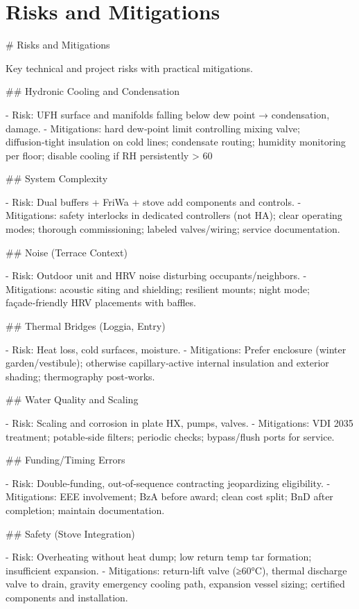 \documentclass[11pt,oneside]{report}
\begin{document}
\chapter{Risks and Mitigations}
\begin{markdown}
# Risks and Mitigations

Key technical and project risks with practical mitigations.

## Hydronic Cooling and Condensation

- Risk: UFH surface and manifolds falling below dew point → condensation, damage.
- Mitigations: hard dew‑point limit controlling mixing valve; diffusion‑tight insulation on cold lines; condensate routing; humidity monitoring per floor; disable cooling if RH persistently > 60%

## System Complexity

- Risk: Dual buffers + FriWa + stove add components and controls.
- Mitigations: safety interlocks in dedicated controllers (not HA); clear operating modes; thorough commissioning; labeled valves/wiring; service documentation.

## Noise (Terrace Context)

- Risk: Outdoor unit and HRV noise disturbing occupants/neighbors.
- Mitigations: acoustic siting and shielding; resilient mounts; night mode; façade‑friendly HRV placements with baffles.

## Thermal Bridges (Loggia, Entry)

- Risk: Heat loss, cold surfaces, moisture.
- Mitigations: Prefer enclosure (winter garden/vestibule); otherwise capillary‑active internal insulation and exterior shading; thermography post‑works.

## Water Quality and Scaling

- Risk: Scaling and corrosion in plate HX, pumps, valves.
- Mitigations: VDI 2035 treatment; potable‑side filters; periodic checks; bypass/flush ports for service.

## Funding/Timing Errors

- Risk: Double‑funding, out‑of‑sequence contracting jeopardizing eligibility.
- Mitigations: EEE involvement; BzA before award; clean cost split; BnD after completion; maintain documentation.

## Safety (Stove Integration)

- Risk: Overheating without heat dump; low return temp tar formation; insufficient expansion.
- Mitigations: return‑lift valve (≥60°C), thermal discharge valve to drain, gravity emergency cooling path, expansion vessel sizing; certified components and installation.
\end{markdown}
\end{document}
